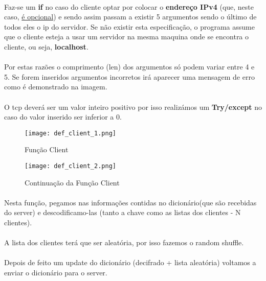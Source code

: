 \documentclass[a4paper,11pt,onecolumn,oneside]{article}
\begin{document}
\paragraph{ }
Faz-se um \textbf{if} no caso do cliente optar por colocar o \textbf{endereço IPv4}  (que, neste caso, \underline{é opcional}) e sendo assim passam a existir 5 argumentos sendo o último de todos eles o ip do servidor. Se não existir esta especificação, o programa assume que o cliente esteja a usar um servidor na mesma maquina onde se encontra o cliente, ou seja, \textbf{localhost}.
\paragraph{ }
Por estas razões o comprimento (len) dos argumentos só podem variar entre 4 e 5. Se forem inseridos argumentos incorretos irá aparecer uma mensagem de erro como é demonstrado na imagem.
\paragraph{ }
O \ac{tcp} deverá ser um valor inteiro positivo por isso realizámos um \textbf{Try/except} no caso do valor inserido ser inferior a 0.

\begin{figure} [h]
\center
\texttt{[image: def\_client\_1.png]}
\caption{Função Client}
\label{função client 1}
\end{figure}

\begin{figure} [h]
\center
\texttt{[image: def\_client\_2.png]}
\caption{Continuação da Função Client}
\label{função client 2}
\end{figure}

\paragraph{ }
Nesta função, pegamos nas informações contidas no dicionário(que são recebidas do server) e descodificamo-las (tanto a chave como as listas dos clientes - N clientes).
\paragraph{ }
A lista dos clientes terá que ser aleatória, por isso fazemos o random shuffle.
\paragraph{ }
Depois de feito um update do dicionário (decifrado + lista aleatória) voltamos a enviar o dicionário para o server.
\end{document}
